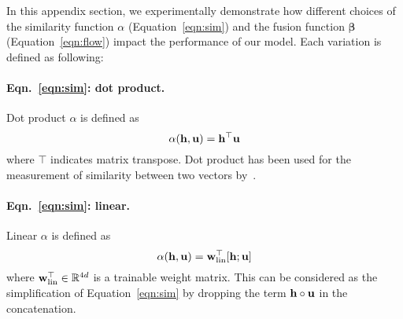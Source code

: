 \begin{table}[htbp] %
    \centering
    \caption{Variations of similarity function $\alpha$ (Equation~\ref{eqn:sim}) and fusion function ${\bm \beta}$ (Equation~\ref{eqn:flow}) and their performance on the dev data of SQuAD. See Appendix~\ref{app:var} for the details of each variation.}
    \label{tab:var}
\end{table}

In this appendix section, we experimentally demonstrate how different choices of the similarity function $\alpha$ (Equation~\ref{eqn:sim}) and the fusion function ${\bm \beta}$ (Equation~\ref{eqn:flow}) impact the performance of our model.
Each variation is defined as following:

\paragraph{Eqn.~\ref{eqn:sim}: dot product.} 
Dot product $\alpha$ is defined as
\begin{equation}
\alpha({\bf h}, {\bf u}) = {\bf h}^\top {\bf u}
\end{equation}
where $\top$ indicates matrix transpose.
Dot product has been used for the measurement of similarity between two vectors by~\cite{hill2015goldilocks}.

\paragraph{Eqn.~\ref{eqn:sim}: linear.} 
Linear $\alpha$ is defined as
\begin{equation}
\alpha({\bf h}, {\bf u}) = {\bf w}_\textup{lin}^\top[{\bf h}; {\bf u}]
\end{equation}
where ${\bf w}^\top_\textup{lin} \in \mathbb{R}^{4d}$ is a trainable weight matrix.
This can be considered as the simplification of Equation~\ref{eqn:sim} by dropping the term ${\bf h} \circ {\bf u}$ in the concatenation. 

